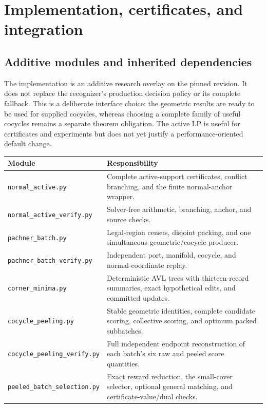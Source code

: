 \section{Implementation, certificates, and integration}
\label{sec:implementation}

\subsection{Additive modules and inherited dependencies}

The implementation is an additive research overlay on the pinned revision.
It does not replace the recognizer's production decision policy or its
complete fallback. This is a deliberate interface choice: the geometric
results are ready to be used for supplied cocycles, whereas choosing a
complete family of useful cocycles remains a separate theorem obligation.
The active LP is useful for certificates and experiments but does not yet
justify a performance-oriented default change.

\begin{longtable}{p{}p{}}
\toprule
Module & Responsibility \\
\midrule
\endhead
\texttt{normal\_active.py} & Complete active-support certificates, conflict
branching, and the finite normal-anchor wrapper. \\
\texttt{normal\_active\_verify.py} & Solver-free arithmetic, branching, anchor,
and source checks. \\
\texttt{pachner\_batch.py} & Legal-region census, disjoint packing, and one
simultaneous geometric/cocycle producer. \\
\texttt{pachner\_batch\_verify.py} & Independent port, manifold, cocycle, and
normal-coordinate replay. \\
\texttt{corner\_minima.py} & Deterministic AVL trees with thirteen-record
summaries, exact hypothetical edits, and committed updates. \\
\texttt{cocycle\_peeling.py} & Stable geometric identities, complete candidate
scoring, collective scoring, and optimum packed subbatches. \\
\texttt{cocycle\_peeling\_verify.py} & Full independent endpoint reconstruction
of each batch's six raw and peeled score quantities. \\
\texttt{peeled\_batch\_selection.py} & Exact reward reduction, the small-cover
selector, optional general matching, and certificate-value/dual checks. \\
\bottomrule
\end{longtable}

